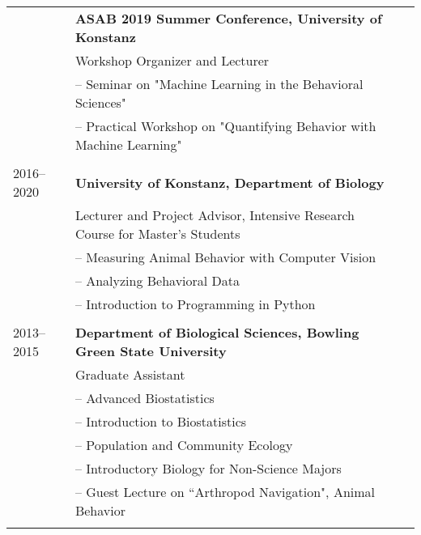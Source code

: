 \documentclass[letterpaper,6pt,oneside]{article}
\begin{document}
\begin{small}
\begin{longtable}{@{} l p{5.3in}l}
	& \textbf{ASAB 2019 Summer Conference, University of Konstanz} \\
	& Workshop Organizer and Lecturer\\
	& – Seminar on "Machine Learning in the Behavioral Sciences" \\
	& – Practical Workshop on "Quantifying Behavior with Machine Learning" \\
	& \\
 \large{2016–2020}
    & \textbf{University of Konstanz, Department of Biology} \\
     & Lecturer and Project Advisor, Intensive Research Course for Master's Students \\
     & – Measuring Animal Behavior with Computer Vision \\
     & – Analyzing Behavioral Data \\
     & – Introduction to Programming in Python\\
     & \\
 \large{2013–2015}
 & \textbf{Department of Biological Sciences, Bowling Green State University} \\
 & Graduate Assistant \\
 & – Advanced Biostatistics\\
 & – Introduction to Biostatistics \\
 & – Population and Community Ecology \\
 & – Introductory Biology for Non-Science Majors \\
 & – Guest Lecture on ``Arthropod Navigation", Animal Behavior \\
 & \\
 

\end{longtable}
\end{small}
\end{document}
